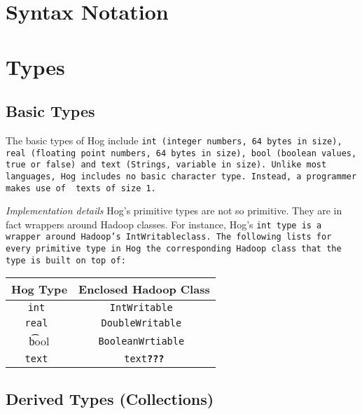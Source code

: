 \documentclass{book}
\begin{document}

\chapter{Syntax Notation} %
\label{cha:syntax_notation}


\chapter{Types} %
\label{cha:types}

\section{Basic Types} %
\label{sec:basic_types}

The basic types of Hog include \tt int \rm (integer numbers, 64 bytes in size), \tt
real \rm (floating point numbers, 64 bytes in size), \tt bool \rm(boolean values,
true or false) and \tt text \rm (Strings, variable in size). Unlike most languages,
Hog includes no basic character type. Instead, a programmer makes use of \tt
text\rm s of size 1.

\emph{Implementation details} Hog’s primitive types are not so primitive. They are
in fact wrappers around Hadoop classes. For instance, Hog’s \tt int \rm type is a
wrapper around Hadoop's \tt IntWritableclass\rm. The following lists for every
primitive type in Hog the corresponding Hadoop class that the type is built on top
of:

\begin{center}
\begin{tabular}{|c|c|}
    \hline
\textbf{Hog Type} & \textbf{Enclosed Hadoop Class} \\ \hline
\tt int & \tt IntWritable \\ \hline
\tt real & \tt DoubleWritable \\ \hline
\t bool & \tt BooleanWrtiable \\ \hline
\tt text & \tt text\textbf{???}\rm \\ \hline
\end{tabular}
\end{center}


\section{Derived Types (Collections)} %
\label{sec:derived_types_collections_}
\end{document}
